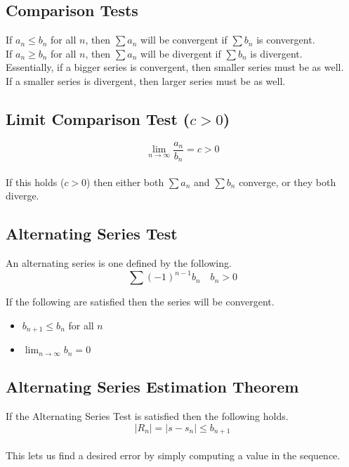 \documentclass[12pt]{article}
\begin{document}
\subsection{Comparison Tests}

If $a_n \leq b_n$ for all $n$, then $\sum a_n$ will be convergent if $\sum b_n$ is convergent.\\
If $a_n \geq b_n$ for all $n$, then $\sum a_n$ will be divergent if $\sum b_n$ is divergent.\\
Essentially, if a bigger series is convergent, then smaller series must be as well.\\
If a smaller series is divergent, then larger series must be as well.


\subsection{Limit Comparison Test ($c > 0$)}

\begin{displaymath}
\lim_{n\to\infty} \frac{a_n}{b_n} = c > 0
\end{displaymath}
\\
If this holds ($c > 0$) then either both $\sum a_n$ and $\sum b_n$ converge, or they both diverge.


\subsection{Alternating Series Test}

An alternating series is one defined by the following.\\
\begin{displaymath}
\sum (-1)^{n-1} b_n\quad b_n > 0
\end{displaymath}

If the following are satisfied then the series will be convergent.
\begin{itemize}
\item $b_{n+1} \leq b_n$ for all $n$
\item $\lim_{n\to\infty} b_n = 0$
\end{itemize}


\subsection{Alternating Series Estimation Theorem}

If the Alternating Series Test is satisfied then the following holds.
\\
\begin{displaymath}
\left|R_n\right| = \left|s - s_n\right| \leq b_{n+1}
\end{displaymath}
\\
This lets us find a desired error by simply computing a value in the sequence.
\end{document}
